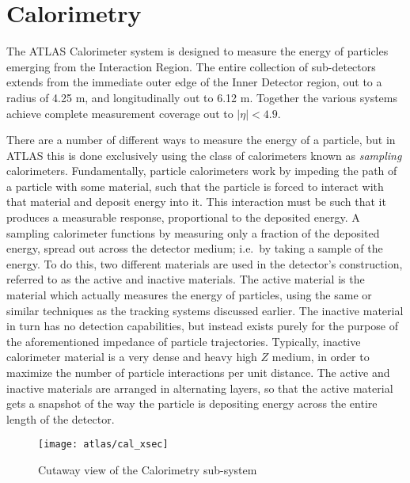 \section{Calorimetry} \label{sec:calorimeter}
    The ATLAS Calorimeter system is designed to measure the energy of particles emerging from the Interaction Region.
    The entire collection of sub-detectors extends from the immediate outer edge of the Inner Detector region, out to a radius of 4.25 m, and longitudinally out to 6.12 m.
    Together the various systems achieve complete measurement coverage out to $|\eta| < 4.9$.

    There are a number of different ways to measure the energy of a particle, but in ATLAS this is done exclusively using the class of calorimeters known as \textit{sampling} calorimeters.
    Fundamentally, particle calorimeters work by impeding the path of a particle with some material, such that the particle is forced to interact with that material and deposit energy into it.
    This interaction must be such that it produces a measurable response, proportional to the deposited energy.
    A sampling calorimeter functions by measuring only a fraction of the deposited energy, spread out across the detector medium; i.e.\ by taking a sample of the energy.
    To do this, two different materials are used in the detector's construction, referred to as the active and inactive materials.
    The active material is the material which actually measures the energy of particles, using the same or similar techniques as the tracking systems discussed earlier.
    The inactive material in turn has no detection capabilities, but instead exists purely for the purpose of the aforementioned impedance of particle trajectories.
    Typically, inactive calorimeter material is a very dense and heavy high $Z$ medium, in order to maximize the number of particle interactions per unit distance.
    The active and inactive materials are arranged in alternating layers, so that the active material gets a snapshot of the way the particle is depositing energy across the entire length of the detector.\cite{energy_measurement}

    \begin{figure}
        \texttt{[image: atlas/cal\_xsec]}
        \caption{Cutaway view of the Calorimetry sub-system \cite{atlas_tdr}}
        \label{fig:cal_xsec}
    \end{figure}

